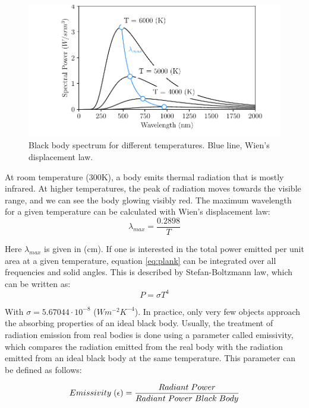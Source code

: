 \begin{figure}[h]
    \centering
    \includegraphics[width=\columnwidth]{PlankEquation/PlankEq.pdf}
    \caption{Black body spectrum for different temperatures. Blue line, Wien's displacement law.}
    \label{fig:MaxWavelenght}
\end{figure}
At room temperature (300K), a body emits thermal radiation that is mostly infrared. At higher temperatures, the peak of radiation moves towards the visible range, and we can see the body glowing visibly red. The maximum wavelength for a given temperature can be calculated with Wien's displacement law:
\begin{equation}
    \lambda_{max} = \frac{0.2898}{T}
\end{equation}

Here $\lambda_{max}$ is given in (cm). If one is interested in the total power emitted per unit area at a given temperature, equation \ref{eq:plank} can be integrated over all frequencies and solid angles. This is described by Stefan-Boltzmann law, which can be written as: 
\begin{equation}
    P = \sigma T^4
\end{equation}

With $\sigma = 5.67044\cdot 10^{-8}$ ($W m^{-2} K^{-4}$). In practice, only very few objects approach the absorbing properties of an ideal black body. Usually, the treatment of radiation emission from real bodies is done using a parameter called emissivity, which compares the radiation emitted from the real body with the radiation emitted from an ideal black body at the same temperature. This parameter can be defined as follows:

\begin{equation}
    Emissivity \hspace{0.1cm} (\epsilon) = \frac{Radiant \hspace{0.1cm}  Power }{Radiant \hspace{0.1cm}  Power \hspace{0.1cm} Black\hspace{0.1cm}  Body}
\end{equation}

